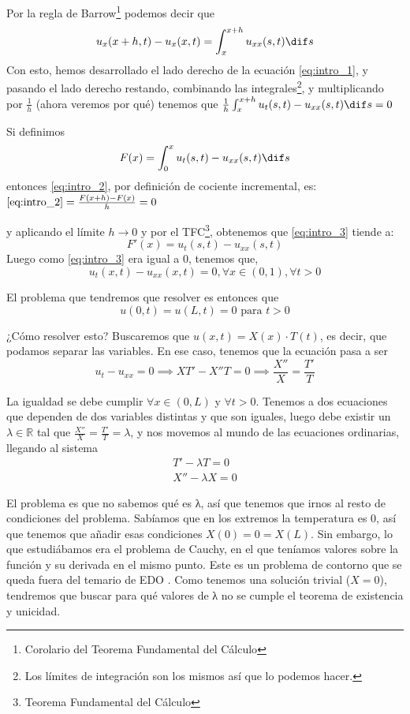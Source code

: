 Por la regla de Barrow\footnote{Corolario del Teorema Fundamental del Cálculo} podemos decir que \[ u_x(x+h, t) - u_x(x,t) = \int_x^{x+h} u_{xx}(s,t) \dif s\]
Con esto, hemos desarrollado el lado derecho de la ecuación \ref{eq:intro_1}, y pasando el lado derecho restando, combinando las integrales\footnote{Los límites de integración son los mismos así que lo podemos hacer.}, y multiplicando por $\frac{1}{h}$ (ahora veremos por qué) tenemos que
\( \frac{1}{h} \int_{x}^{x+h} u_t(s,t) - u_{xx}(s,t) \dif s = 0 \label{eq:intro_2}\)

Si definimos $$F(x) = \int_{0}^{x} u_t(s,t) - u_{xx}(s,t) \dif s $$ entonces \ref{eq:intro_2}, por definición de cociente incremental, es:
\( \ref{eq:intro_2} = \frac{F(x+h) - F(x)}{h} = 0  \label{eq:intro_3}\)

y aplicando el límite $h \to 0$ y por el TFC\footnote{Teorema Fundamental del Cálculo}, obtenemos que \ref{eq:intro_3} tiende a:
\[ F'(x) = u_t(s,t) - u_{xx}(s,t) \]
Luego como \ref{eq:intro_3} era igual a 0, tenemos que,
\[ u_t(x,t) - u_{xx} (x,t) = 0, \forall x \in (0,1), \forall t > 0\]

El problema que tendremos que resolver es entonces que
$$u(0,t) = u(L,t) = 0 \text{ para } t > 0$$

¿Cómo resolver esto? Buscaremos que $u(x,t) = X(x) · T(t)$, es decir, que podamos separar las variables. En ese caso, tenemos que la ecuación pasa a ser \[ u_t - u_{xx} = 0 \implies XT' - X''T = 0 \implies \frac{X''}{X} = \frac{T'}{T} \]

La igualdad se debe cumplir $∀x ∈ (0,L)$ y $∀t > 0$. Tenemos a dos ecuaciones que dependen de dos variables distintas y que son iguales, luego debe existir un $λ ∈ ℝ$ tal que $\frac{X''}{X} = \frac{T'}{T} = λ$, y nos movemos al mundo de las ecuaciones ordinarias, llegando al sistema  \[ \begin{matrix} T' - λT = 0 \\ X'' - λX = 0 \end{matrix}\]

El problema es que no sabemos qué es λ, así que tenemos que irnos al resto de condiciones del problema. Sabíamos que en los extremos la temperatura es 0, así que tenemos que añadir esas condiciones $X(0) = 0 = X(L)$. Sin embargo, lo que estudiábamos era el problema de Cauchy, en el que teníamos valores sobre la función y su derivada en el mismo punto. Este es un problema de contorno que se queda fuera del temario de EDO \citep{ApuntesEDO}. Como tenemos una solución trivial ($X = 0$), tendremos que buscar para qué valores de λ no se cumple el teorema de existencia y unicidad.

